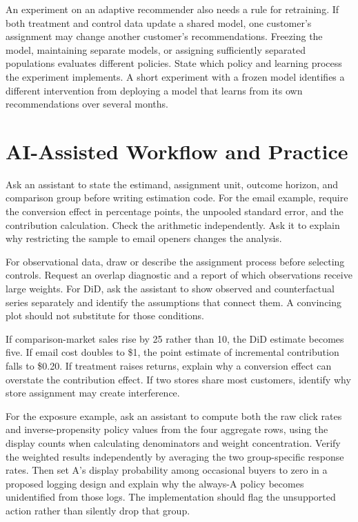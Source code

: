 An experiment on an adaptive recommender also needs a rule for
retraining. If both treatment and control data update a shared model,
one customer's assignment may change another customer's recommendations.
Freezing the model, maintaining separate models, or assigning
sufficiently separated populations evaluates different policies. State
which policy and learning process the experiment implements. A short
experiment with a frozen model identifies a different intervention from
deploying a model that learns from its own recommendations over several
months.

\hypertarget{M06-ai-assisted-workflow-and-practice}{%
\section{AI-Assisted Workflow and
Practice}\label{M06-ai-assisted-workflow-and-practice}}

\noindent Ask an assistant to state the estimand, assignment unit, outcome
horizon, and comparison group before writing estimation code. For the
email example, require the conversion effect in percentage points, the
unpooled standard error, and the contribution calculation. Check the
arithmetic independently. Ask it to explain why restricting the sample
to email openers changes the analysis.

For observational data, draw or describe the assignment process before
selecting controls. Request an overlap diagnostic and a report of which
observations receive large weights. For DiD, ask the assistant to show
observed and counterfactual series separately and identify the
assumptions that connect them. A convincing plot should not substitute
for those conditions.

If comparison-market sales rise by 25 rather than 10, the DiD estimate
becomes five. If email cost doubles to \$1, the point estimate of
incremental contribution falls to \$0.20. If treatment raises returns,
explain why a conversion effect can overstate the contribution effect.
If two stores share most customers, identify why store assignment may
create interference.

For the exposure example, ask an assistant to compute both the raw click
rates and inverse-propensity policy values from the four aggregate rows,
using the display counts when calculating denominators and weight
concentration. Verify the weighted results independently by averaging
the two group-specific response rates. Then set A's display probability
among occasional buyers to zero in a proposed logging design and explain
why the always-A policy becomes unidentified from those logs. The
implementation should flag the unsupported action rather than silently
drop that group.


